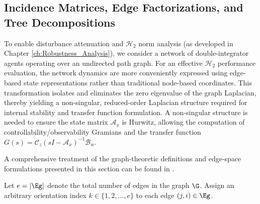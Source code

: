 \subsection{Incidence Matrices, Edge Factorizations, and Tree Decompositions}
To enable disturbance attenuation and $\mathcal{H}_2$ norm analysis (as developed in Chapter \ref{ch:Robustness_Analysis}), we consider a network of double-integrator agents operating over an undirected path graph. For an effective $\mathcal{H}_2$ performance evaluation, the network dynamics are more conveniently expressed using edge-based state representations rather than traditional node-based coordinates. This transformation isolates and eliminates the zero eigenvalue of the graph Laplacian, thereby yielding a non-singular, reduced-order Laplacian structure required for internal stability and transfer function formulation. A non-singular structure is needed to ensure the state matrix $\mathcal{A}_x$ is Hurwitz, allowing the computation of controllability/observability Gramians and the transfer function $G(s) = \mathcal{C}_z(sI - \mathcal{A}_x)^{-1}\mathcal{B}_w$.

A comprehensive treatment of the graph-theoretic definitions and edge-space formulations presented in this section can be found in \cite{zelazo2007agreement, zelazo2009h2, zelazo2010edge}.

Let $e = |\Eg|$ denote the total number of edges in the graph $\G$. Assign an arbitrary orientation index $k \in \{1, 2, \dots, e\}$ to each edge $(j, i) \in \Eg$.

